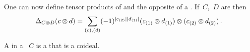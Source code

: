 \documentclass[a4paper,10pt,headings=standardclasses]{scrartcl}
\begin{document}

\begin{remark}
One can now define tensor products of {\dgcs} and the opposite of a {\dgc}.
If~$C$,~$D$ are {\dgcs} then
\[
  \Delta_{C \otimes D}(c \otimes d)
  =
  \sum_{(c), (d)}
  (-1)^{\lvert c_{(2)}\rvert \lvert d_{(1)}\rvert}
  (c_{(1)} \otimes d_{(1)}) \otimes (c_{(2)} \otimes d_{(2)}) \,.
\]
\end{remark}


\begin{definition}
  A  in a {\dgc}~$C$ is a {\dgsub} that is a coideal.
\end{definition}
\end{document}
